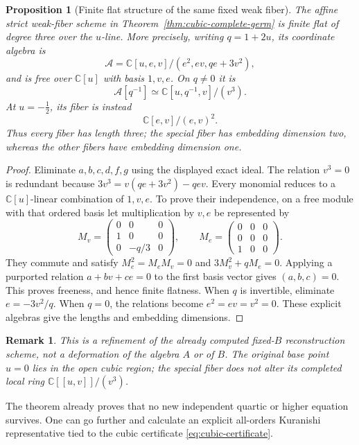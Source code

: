 \documentclass[11pt]{amsart}
\newtheorem{proposition}[theorem]{Proposition}
\newtheorem{remark}[theorem]{Remark}
\newcommand{\C}{\mathbb C}
\begin{document}
\begin{proposition}[Finite flat structure of the same fixed weak fiber]\label{prop:cubic-flat-family}
The affine strict weak-fiber scheme in Theorem~\ref{thm:cubic-complete-germ}
is finite flat of degree three over the \(u\)-line. More precisely, writing
\(q=1+2u\), its coordinate algebra is
\[
\mathcal A=\C[u,e,v]/(e^2,ev,qe+3v^2),
\]
and is free over \(\C[u]\) with basis \(1,v,e\).
On \(q\ne0\) it is
\[
\mathcal A[q^{-1}]\simeq\C[u,q^{-1},v]/(v^3).
\]
At \(u=-\tfrac12\), its fiber is instead
\[
\C[e,v]/(e,v)^2.
\]
Thus every fiber has length three; the special fiber has embedding dimension two,
whereas the other fibers have embedding dimension one.
\end{proposition}
\begin{proof}
Eliminate \(a,b,c,d,f,g\) using the displayed exact ideal. The relation \(v^3=0\)
is redundant because \(3v^3=v(qe+3v^2)-qev\).
Every monomial reduces to a \(\C[u]\)-linear combination of \(1,v,e\).
To prove their independence, on a free module with that ordered basis let multiplication
by \(v,e\) be represented by
\[
M_v=\begin{pmatrix}0&0&0\\1&0&0\\0&-q/3&0\end{pmatrix},
\qquad
M_e=\begin{pmatrix}0&0&0\\0&0&0\\1&0&0\end{pmatrix}.
\]
They commute and satisfy \(M_e^2=M_eM_v=0\) and \(3M_v^2+qM_e=0\).
Applying a purported relation \(a+bv+ce=0\) to the first basis vector gives
\((a,b,c)=0\). This proves freeness, and hence finite flatness.
When \(q\) is invertible, eliminate \(e=-3v^2/q\). When \(q=0\), the relations
become \(e^2=ev=v^2=0\). These explicit algebras give the lengths and embedding dimensions.
\end{proof}

\begin{remark}
This is a refinement of the already computed fixed-\(B\) reconstruction scheme,
not a deformation of the algebra \(A\) or of \(B\). The original base point
\(u=0\) lies in the open cubic region; the special fiber does not alter its
completed local ring \(\C[[u,v]]/(v^3)\).
\end{remark}

The theorem already proves that no new independent quartic or higher equation survives.  One can go further and calculate an explicit all-orders Kuranishi representative tied to the cubic certificate \eqref{eq:cubic-certificate}.
\end{document}
